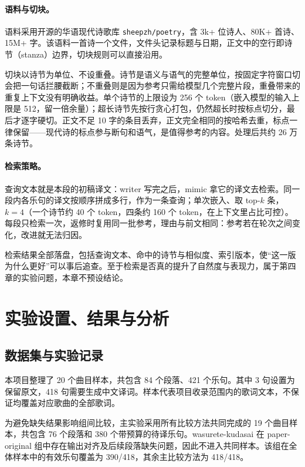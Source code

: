 \documentclass[12pt, a4paper]{ctexart}
\numberwithin{table}{section}
\numberwithin{figure}{section}
\begin{document}
\paragraph{语料与切块。}
语料采用开源的华语现代诗歌库 \texttt{sheepzh/poetry}，含 3k+ 位诗人、80K+ 首诗、15M+ 字。该语料一首诗一个文件，文件头记录标题与日期，正文中的空行即诗节（stanza）边界，切块规则可以直接沿用。

切块以诗节为单位、不设重叠。诗节是语义与语气的完整单位，按固定字符窗口切会把一句话拦腰截断；不重叠则是因为参考只需给模型几个完整片段，重叠带来的重复上下文没有明确收益。单个诗节的上限设为 256 个 token（嵌入模型的输入上限是 512，留一倍余量）；超长诗节先按行贪心打包，仍然超长时按标点切分，最后才逐字硬切。正文不足 10 字的条目丢弃，正文完全相同的按哈希去重，标点一律保留——现代诗的标点参与断句和语气，是值得参考的内容。处理后共约 26 万条诗节。

\paragraph{检索策略。}
查询文本就是本段的初稿译文：writer 写完之后，mimic 拿它的译文去检索。同一段内各乐句的译文按顺序拼成多行，作为一条查询；单次嵌入、取 top-$k$ 条，$k=4$（一个诗节约 40 个 token，四条约 160 个 token，在上下文里占比可控）。每段只检索一次，返修时复用同一批参考，理由与前文相同：参考若在轮次之间变化，改进就无法归因。

检索结果全部落盘，包括查询文本、命中的诗节与相似度、索引版本，使“这一版为什么更好”可以事后追查。至于检索是否真的提升了自然度与表现力，属于第四章的实验问题，本章不预设结论。

\section{实验设置、结果与分析}

\subsection{数据集与实验记录}
本项目整理了 20 个曲目样本，共包含 84 个段落、421 个乐句。其中 3 句设置为保留原文，418 句需要生成中文译词。样本代表项目收录范围内的歌词文本，不保证均覆盖对应歌曲的全部歌词。

为避免缺失结果影响组间比较，主实验采用所有比较方法共同完成的 19 个曲目样本，共包含 76 个段落和 380 个带预算的待译乐句。wasurete-kudasai 在 paper-original 组中存在输出对齐及后续段落缺失问题，因此不进入共同样本。该组在全体样本中的有效乐句覆盖为 390/418，其余主比较方法为 418/418。
\end{document}
